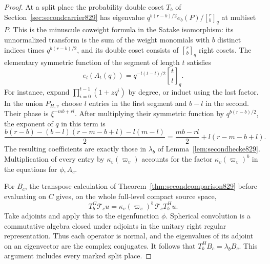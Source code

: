 \documentclass[a4paper,11pt]{article}
\theoremstyle{definition}
\theoremstyle{remark}
\numberwithin{equation}{section}
\begin{document}
\begin{proof}
At a split place the probability double coset \(T_b\) of
Section~\ref{sec:secondcarrier829} has eigenvalue
\(q^{b(r-b)/2}e_b(P)/{r\brack b}_q\) at multiset \(P\).
This is the minuscule coweight formula in the Satake
isomorphism: its unnormalized transform is the sum of the
weight monomials with \(b\) distinct indices times
\(q^{b(r-b)/2}\), and its double coset consists of
\({r\brack b}_q\) right cosets. The elementary symmetric
function of the segment of length \(t\) satisfies
\[
            e_l(A_t(q))=q^{-l(t-l)/2}{t\brack l}_q .
\]
For instance, expand \(\prod_{i=0}^{t-1}(1+zq^i)\) by degree,
or induct using the last factor. In the union \(P_{H,v}\)
choose \(l\) entries in the first segment and \(b-l\) in
the second. Their phase is \(\xi^{-mb+rl}\). After multiplying
their symmetric function by \(q^{b(r-b)/2}\), the exponent
of \(q\) in this term is
\[
 \frac{b(r-b)-(b-l)(r-m-b+l)-l(m-l)}2
             =\frac{mb-rl}{2}+l(r-m-b+l).
\]
The resulting coefficients are exactly those in \(\lambda_b\)
of Lemma~\ref{lem:secondhecke829}. Multiplication of every
entry by \(\kappa_v(\varpi_v)\) accounts for the factor
\(\kappa_v(\varpi_v)^b\) in the equations for \(\phi,A_c\).

For \(B_c\), the transpose calculation of
Theorem~\ref{thm:secondcomparison829} before evaluating on
\(C\) gives, on the whole full-level compact source space,
\[
 T_b^G\mathcal T_c u
    =\kappa_v(\varpi_v)^b\,\mathcal T_c T_b^H u .
\]
Take adjoints and apply this to the eigenfunction \(\phi\).
Spherical convolution is a commutative algebra closed under
adjoints in the unitary right regular representation. Thus
each operator is normal, and the eigenvalues of its adjoint
on an eigenvector are the complex conjugates. It follows
that \(T_b^H B_c=\lambda_b B_c\). This argument includes
every marked split place.


\end{proof}
\end{document}
